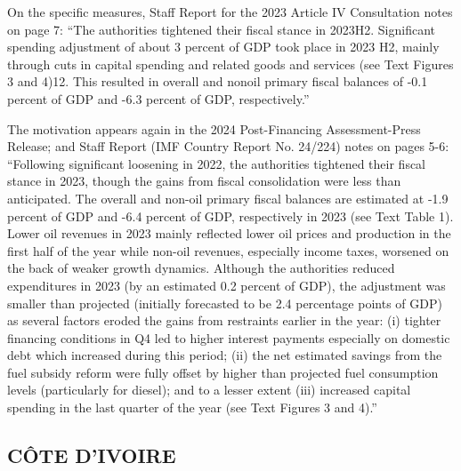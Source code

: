 On the specific measures, Staff Report for the 2023 Article IV Consultation notes on page 7: “The authorities tightened their fiscal stance in 2023H2. Significant spending adjustment of about 3 percent of GDP took place in 2023 H2, mainly through cuts in capital spending and related goods and services (see Text Figures 3 and 4)12. This resulted in overall and nonoil primary fiscal balances of -0.1 percent of GDP and -6.3 percent of GDP, respectively.” 

The motivation appears again in the 2024 Post-Financing Assessment-Press Release; and Staff Report (IMF Country Report No. 24/224) notes on pages 5-6: “Following significant loosening in 2022, the authorities tightened their fiscal stance in 2023, though the gains from fiscal consolidation were less than anticipated. The overall and non-oil primary fiscal balances are estimated at -1.9 percent of GDP and -6.4 percent of GDP, respectively in 2023 (see Text Table 1). Lower oil revenues in 2023 mainly reflected lower oil prices and production in the first half of the year while non-oil revenues, especially income taxes, worsened on the back of weaker growth dynamics. Although the authorities reduced expenditures in 2023 (by an estimated 0.2 percent of GDP), the adjustment was smaller than projected (initially forecasted to be 2.4 percentage points of GDP) as several factors eroded the gains from restraints earlier in the year: (i) tighter financing conditions in Q4 led to higher interest payments especially on domestic debt which increased during this period; (ii) the net estimated savings from the fuel subsidy reform were fully offset by higher than projected fuel consumption levels (particularly for diesel); and to a lesser extent (iii) increased capital spending in the last quarter of the year (see Text Figures 3 and 4).”

\subsection[CÔTE D'IVOIRE]{CÔTE D'IVOIRE\protect\footnotemark}

